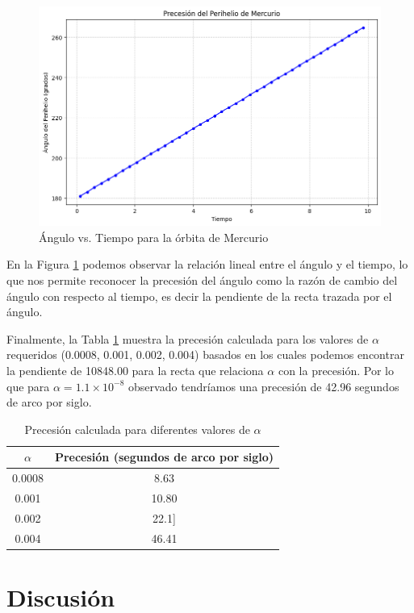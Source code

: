 \documentclass[twocolumn]{article}
\begin{document}
\begin{figure}[H]
\centering
\includegraphics[width=0.9\columnwidth]{./figures/precesion_mercurio.png}
\caption{Ángulo vs. Tiempo para la órbita de Mercurio}
\label{fig:angulo_vs_tiempo}
\end{figure}

En la Figura \ref{fig:angulo_vs_tiempo} podemos observar la relación lineal entre el ángulo y el tiempo, lo que nos permite reconocer la precesión del ángulo como la razón de cambio del ángulo con respecto al tiempo, es decir la pendiente de la recta trazada por el ángulo.

Finalmente, la Tabla \ref{tab:precesion} muestra la precesión calculada para los valores de $\alpha$ requeridos (0.0008, 0.001, 0.002, 0.004) basados en los cuales podemos encontrar la pendiente de 10848.00 para la recta que relaciona $\alpha$ con la precesión. Por lo que para $\alpha = 1.1 \times 10^{-8}$ observado tendríamos una precesión de 42.96 segundos de arco por siglo.

\begin{table}[H]
\centering
\caption{Precesión calculada para diferentes valores de $\alpha$}
\label{tab:precesion}
\begin{tabular}{@{}cc@{}}
\toprule
$\alpha$ & Precesión (segundos de arco por siglo) \\
\midrule
0.0008 & 8.63 \\
0.001 & 10.80 \\
0.002 & 22.1] \\
0.004 & 46.41 \\
\bottomrule
\end{tabular}
\end{table}

\section{Discusión}
\end{document}
